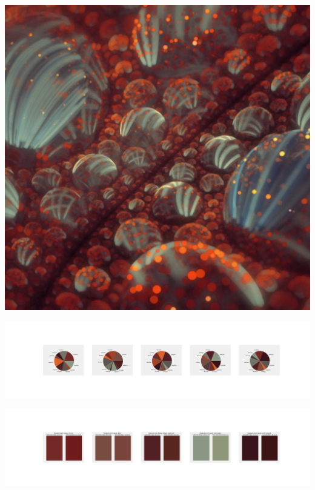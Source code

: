 \documentclass[11pt]{article}
\begin{document}
\begin{landscape}
    \begin{center}
    \includegraphics[width=\textwidth]{./nbimg/file (417).jpg}
    \end{center}

    \begin{center}
    \includegraphics[width=250mm]{./nbimg/pie-353.jpg}
    \end{center}

    \begin{center}
    \includegraphics[width=250mm]{./nbimg/peak-353.jpg}
    \end{center}
    


\end{landscape}
\end{document}
